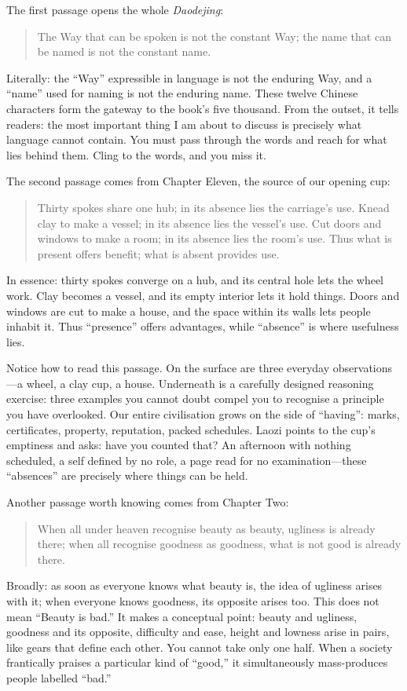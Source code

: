 The first passage opens the whole \textit{Daodejing}:

\begin{quote}
The Way that can be spoken is not the constant Way; the name that can be named is not the constant name.
\end{quote}
Literally: the ``Way'' expressible in language is not the enduring Way, and a ``name'' used for naming is not the enduring name. These twelve Chinese characters form the gateway to the book's five thousand. From the outset, it tells readers: the most important thing I am about to discuss is precisely what language cannot contain. You must pass through the words and reach for what lies behind them. Cling to the words, and you miss it.

The second passage comes from Chapter Eleven, the source of our opening cup:

\begin{quote}
Thirty spokes share one hub; in its absence lies the carriage's use. Knead clay to make a vessel; in its absence lies the vessel's use. Cut doors and windows to make a room; in its absence lies the room's use. Thus what is present offers benefit; what is absent provides use.
\end{quote}
In essence: thirty spokes converge on a hub, and its central hole lets the wheel work. Clay becomes a vessel, and its empty interior lets it hold things. Doors and windows are cut to make a house, and the space within its walls lets people inhabit it. Thus ``presence'' offers advantages, while ``absence'' is where usefulness lies.

Notice how to read this passage. On the surface are three everyday observations---a wheel, a clay cup, a house. Underneath is a carefully designed reasoning exercise: three examples you cannot doubt compel you to recognise a principle you have overlooked. Our entire civilisation grows on the side of ``having'': marks, certificates, property, reputation, packed schedules. Laozi points to the cup's emptiness and asks: have you counted that? An afternoon with nothing scheduled, a self defined by no role, a page read for no examination---these ``absences'' are precisely where things can be held.

Another passage worth knowing comes from Chapter Two:

\begin{quote}
When all under heaven recognise beauty as beauty, ugliness is already there; when all recognise goodness as goodness, what is not good is already there.
\end{quote}
Broadly: as soon as everyone knows what beauty is, the idea of ugliness arises with it; when everyone knows goodness, its opposite arises too. This does not mean ``Beauty is bad.'' It makes a conceptual point: beauty and ugliness, goodness and its opposite, difficulty and ease, height and lowness arise in pairs, like gears that define each other. You cannot take only one half. When a society frantically praises a particular kind of ``good,'' it simultaneously mass-produces people labelled ``bad.''

